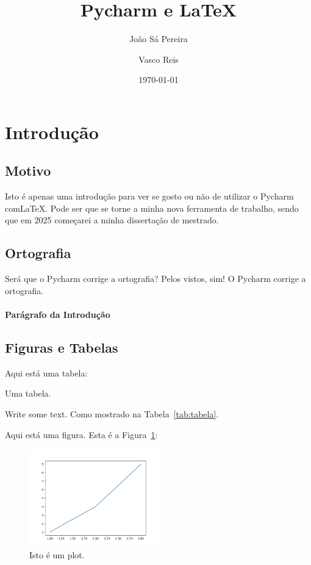 \documentclass[11pt, a4paper]{article}
\author[1]{João Sá Pereira}
\author[2]{Vasco Reis}
\affil[1]{FEUP}
\affil[2]{IST}
\title{Pycharm e \LaTeX}
\date{\today}
\begin{document}
    \maketitle
    \tableofcontents
    \listoffigures
    \listoftables
    \section{Introdução}\label{sec:introducao}

    \lipsum[1]

    \subsection{Motivo}\label{subsec:motivo}

    Isto é apenas uma introdução para ver se gosto ou não de utilizar o Pycharm com\LaTeX.
    Pode ser que se torne a minha nova ferramenta de trabalho, sendo que em 2025 começarei a minha dissertação de mestrado.
    \lipsum[1]

    \subsection{Ortografia}\label{subsec:ortografia}

    Será que o Pycharm corrige a ortografia?
    Pelos vistos, sim!
    O Pycharm corrige a ortografia.
    \lipsum[2]

    \paragraph{Parágrafo da Introdução} \lipsum[3]
    
    \subsection{Figuras e Tabelas}\label{subsec:figuras-e-tabelas}

    Aqui está uma tabela:

    \begin{table}[htb!]
        \centering
        
        \caption{Uma tabela.}\label{tab:tabela}
    \end{table}

    Write some text.
    Como mostrado na Tabela~\ref{tab:tabela}. \lipsum[5]

    Aqui está uma figura.
    Esta é a Figura~\ref{fig:figure}:
    \begin{figure}[htb!]
        \centering
        \includegraphics[width=0.5\textwidth]{figures/figure}
        \caption{Isto é um plot.}\label{fig:figure}
    \end{figure}
\end{document}
